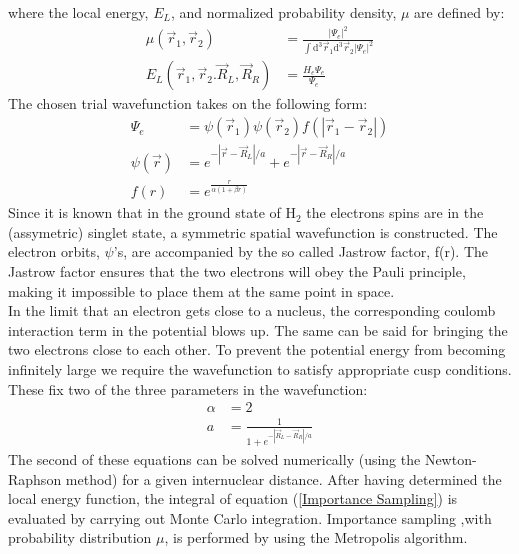 \documentclass[a4paper,10pt]{article}
\begin{document}
where the local energy, $E_{L}$, and normalized probability density, $\mu$ are defined by:
		\begin{subequations}
		\begin{align}
		\mu(\vec{r}_1,\vec{r}_2) &= \frac{|\Psi_{e}|^{2} } { \int \mathrm{d}^{3} \vec{r}_1  \mathrm{d}^{3} \vec{r}_2 |\Psi_{e}|^{2} } \\
E_{L}(\vec{r}_1,\vec{r}_{2}. \vec{R}_L,\vec{R}_{R}) &=  \frac{H_{e} \Psi_{e}} { \Psi_{e} }			\label{Elocaldef}
		\end{align}
		\end{subequations}
The chosen trial wavefunction takes on the following form:
		\begin{subequations} 
		\begin{align}
		\Psi_{e} &= \psi(\vec{r}_1) \psi(\vec{r}_2) f(|\vec{r}_{1} - \vec{r}_2|)   \\
		\psi(\vec{r}) &= e^{-|\vec{r} -\vec{R}_{L}| /a }  +e^{-|\vec{r} -\vec{R}_{R}| /a }     \label{Orbit}\\
		f(r)   &= e^{\frac{r}{\alpha(1+\beta r)} }
		\end{align}
		\label{Wavefunction}
		\end{subequations}
Since it is known that in the ground state of H$_{2}$ the electrons spins are in the (assymetric) singlet state, a symmetric spatial wavefunction is constructed. The electron orbits, $\psi$'s, are accompanied by the so called Jastrow factor, f(r). The Jastrow factor ensures that the two electrons will obey the Pauli principle, making it impossible to place them at the same point in space.  \\
In the limit that an electron gets close to a nucleus, the corresponding coulomb interaction term in the potential blows up. The same can be said for bringing the two electrons close to each other. To prevent the potential energy from becoming infinitely large we require the wavefunction to satisfy appropriate cusp conditions. These fix two of the three parameters in the wavefunction:
		\begin{subequations}
		\begin{align}
		\alpha &= 2         \label{cuspalpha}    \\         
		a &= \frac{1}{1+e^{-|\vec{R}_L -\vec{R}_R|/a} } \label{cuspa}
		\end{align}
		\end{subequations}
The second of these equations can be solved numerically (using the Newton-Raphson method)  for a given internuclear distance.  After having determined the local energy function, the integral of equation (\ref{Importance Sampling}) is evaluated by carrying out Monte Carlo integration. Importance sampling ,with probability distribution $\mu$, is performed by using the Metropolis algorithm.
\end{document}
